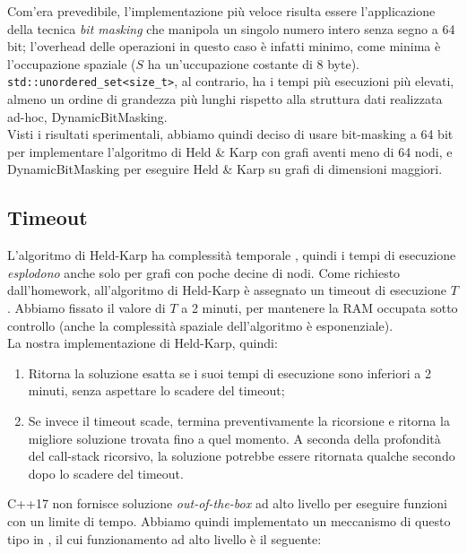 \noindent Com'era prevedibile, l'implementazione più veloce risulta essere l'applicazione della tecnica \textit{bit masking} che manipola un singolo numero intero senza segno a 64 bit; l'overhead delle operazioni in questo caso è infatti minimo, come minima è l'occupazione spaziale ($S$ ha un'uccupazione costante di 8 byte). \\

\noindent \texttt{std::unordered_set<size_t>}, al contrario, ha i tempi più esecuzioni più elevati, almeno un ordine di grandezza più lunghi rispetto alla struttura dati realizzata ad-hoc, DynamicBitMasking. \\

\noindent Visti i risultati sperimentali, abbiamo quindi deciso di usare bit-masking a 64 bit per implementare l'algoritmo di Held \& Karp con grafi aventi meno di 64 nodi, e DynamicBitMasking per eseguire Held \& Karp su grafi di dimensioni maggiori.

\subsection{Timeout}

\noindent L'algoritmo di Held-Karp ha complessità temporale \complexityHeldKarpTime{}, quindi i tempi di esecuzione \textit{esplodono} anche solo per grafi con poche decine di nodi. Come richiesto dall'homework, all'algoritmo di Held-Karp è assegnato un timeout di esecuzione $T$. Abbiamo fissato il valore di $T$ a 2 minuti, per mantenere la RAM occupata sotto controllo (anche la complessità spaziale dell'algoritmo è esponenziale).\\

\noindent La nostra implementazione di Held-Karp, quindi:

\begin{enumerate}
    \item Ritorna la soluzione esatta se i suoi tempi di esecuzione sono inferiori a 2 minuti, senza aspettare lo scadere del timeout;
    \item Se invece il timeout scade, termina preventivamente la ricorsione e ritorna la migliore soluzione trovata fino a quel momento. A seconda della profondità del call-stack ricorsivo, la soluzione potrebbe essere ritornata qualche secondo dopo lo scadere del timeout.
\end{enumerate}

\noindent C++17 non fornisce soluzione \textit{out-of-the-box} ad alto livello per eseguire funzioni con un limite di tempo. Abbiamo quindi implementato un meccanismo di questo tipo in , il cui funzionamento ad alto livello è il seguente:

